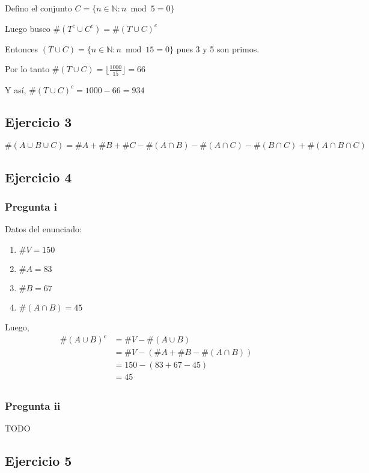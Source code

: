 Defino el conjunto $ C = \{ n \in \mathbb{N}: n \bmod 5 = 0 \} $

Luego busco $ \#(T^c \cup C^c) = \#(T \cup C)^c $

Entonces $ (T \cup C) = \{ n \in \mathbb{N}: n \bmod 15 = 0 \} $ pues 3 y 5 son primos.

Por lo tanto $ \#(T \cup C) = \lfloor \frac{1000}{15} \rfloor = 66$

Y así, $ \#(T \cup C)^c = 1000 - 66 = 934 $

\subsection{Ejercicio 3}

$ \#(A \cup B \cup C) = \#A + \#B+ \#C - \#(A \cap B) - \#(A \cap C) - \#(B \cap C) + \#(A \cap B \cap C) $

\subsection{Ejercicio 4}
\subsubsection{Pregunta i}

Datos del enunciado:
\begin{enumerate}
    \item $ \#V = 150 $
    \item $ \#A = 83 $
    \item $ \#B = 67 $
    \item $ \#(A \cap B) = 45 $
\end{enumerate}

Luego,
\begin{align*}
    \#(A \cup B)^c &= \#V - \#(A\cup B) \\
    &= \#V - (\#A + \#B - \#(A \cap B)) \\
    &= 150 - (83 + 67 - 45) \\
    &= 45 \\
\end{align*}

\subsubsection{Pregunta ii}
TODO

\subsection{Ejercicio 5}

